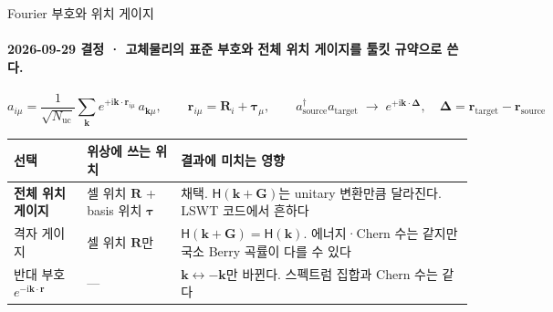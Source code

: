 \begin{frame}[label=fourier-convention]{Fourier 부호와 위치 게이지}
  \framesubtitle{2026-09-29 결정 · 고체물리의 표준 부호와 전체 위치 게이지를 툴킷 규약으로 쓴다.}
  \[
    a_{i\mu}=\frac{1}{\sqrt{N_{\mathrm{uc}}}}\sum_{\mathbf k}e^{+\mathrm i\mathbf k\cdot\mathbf r_{i\mu}}\,a_{\mathbf k\mu},
    \qquad \mathbf r_{i\mu}=\mathbf R_i+\symbf\tau_\mu,
    \qquad a^\dagger_{\mathrm{source}}a_{\mathrm{target}}\;\to\;e^{+\mathrm i\mathbf k\cdot\symbf\Delta},\quad
    \symbf\Delta=\mathbf r_{\mathrm{target}}-\mathbf r_{\mathrm{source}}
  \]
  \small
  \begin{tabularx}{\textwidth}{@{}P{2.4cm}P{3.6cm}Y@{}}
    \toprule
    선택 & 위상에 쓰는 위치 & 결과에 미치는 영향 \\
    \midrule
    \textbf{전체 위치 게이지} & 셀 위치 $\mathbf R$ + basis 위치 $\symbf\tau$ & 채택. $\mathsf H(\mathbf k+\mathbf G)$는 unitary 변환만큼 달라진다. LSWT 코드에서 흔하다 \\
    격자 게이지 & 셀 위치 $\mathbf R$만 & $\mathsf H(\mathbf k+\mathbf G)=\mathsf H(\mathbf k)$. 에너지·Chern 수는 같지만 국소 Berry 곡률이 다를 수 있다 \\
    반대 부호 $e^{-\mathrm i\mathbf k\cdot\mathbf r}$ & — & $\mathbf k\leftrightarrow-\mathbf k$만 바뀐다. 스펙트럼 집합과 Chern 수는 같다 \\
    \bottomrule
  \end{tabularx}
  \par\medskip
\end{frame}

